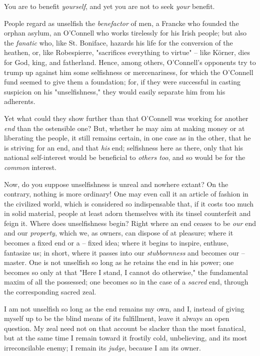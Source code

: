 You are to benefit \textit{yourself}, and yet you are not to seek 
\textit{your} benefit.

People regard as unselfish the \textit{benefactor} of men, a Francke who 
founded the orphan asylum, an O'Connell who works tirelessly for his Irish 
people; but also the \textit{fanatic} who, like St. Boniface, hazards his life 
for the conversion of the heathen, or, like Robespierre, "{}sacrifices 
everything to virtue"{} -- like K\"orner, dies for God, king, and fatherland. 
Hence, among others, O'Connell's opponents try to trump up against him some 
selfishness or mercenariness, for which the O'Connell fund seemed to give them 
a foundation; for, if they were successful in casting suspicion on his 
"{}unselfishness,"{} they would easily separate him from his adherents.

Yet what could they show further than that O'Connell was working for another 
\textit{end} than the ostensible one? But, whether he may aim at making money 
or at liberating the people, it still remains certain, in one case as in the 
other, that he is striving for an end, and that \textit{his} end; selfishness 
here as there, only that his national self-interest would be beneficial to 
\textit{others too}, and so would be for the \textit{common} interest.

Now, do you suppose unselfishness is unreal and nowhere extant? On the 
contrary, nothing is more ordinary! One may even call it an article of fashion 
in the civilized world, which is considered so indispensable that, if it costs 
too much in solid material, people at least adorn themselves with its tinsel 
counterfeit and feign it. Where does unselfishness begin? Right where an end 
ceases to be \textit{our} end and our \textit{property}, which we, as owners, 
can dispose of at pleasure; where it becomes a fixed end or a -- fixed idea; 
where it begins to inspire, enthuse, fantasize us; in short, where it passes 
into our \textit{stubbornness} and becomes our -- master. One is not unselfish 
so long as he retains the end in his power; one becomes so only at that 
"{}Here I stand, I cannot do otherwise,"{} the fundamental maxim of all the 
possessed; one becomes so in the case of a \textit{sacred} end, through the 
corresponding sacred zeal.

I am not unselfish so long as the end remains my own, and I, instead of giving 
myself up to be the blind means of its fulfillment, leave it always an open 
question. My zeal need not on that account be slacker than the most fanatical, 
but at the same time I remain toward it frostily cold, unbelieving, and its 
most irreconcilable enemy; I remain its \textit{judge}, because I am its 
owner.

